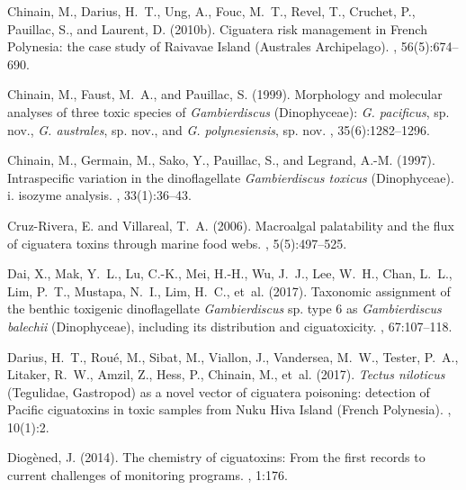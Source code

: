 \documentclass[10pt,letterpaper]{article}
\begin{document}
\begin{thebibliography}{10}
Chinain, M., Darius, H.~T., Ung, A., Fouc, M.~T., Revel, T., Cruchet, P.,
  Pauillac, S., and Laurent, D. (2010b).
\newblock Ciguatera risk management in {F}rench {P}olynesia: the case study of
  {R}aivavae {I}sland ({A}ustrales {A}rchipelago).
, 56(5):674--690.

Chinain, M., Faust, M.~A., and Pauillac, S. (1999).
\newblock Morphology and molecular analyses of three toxic species of
  \emph{Gambierdiscus} ({D}inophyceae): \emph{G. pacificus}, sp. nov., \emph{G.
  australes}, sp. nov., and \emph{G. polynesiensis}, sp. nov.
, 35(6):1282--1296.

Chinain, M., Germain, M., Sako, Y., Pauillac, S., and Legrand, A.-M. (1997).
\newblock Intraspecific variation in the dinoflagellate \emph{Gambierdiscus
  toxicus} ({D}inophyceae). i. isozyme analysis.
, 33(1):36--43.

Cruz-Rivera, E. and Villareal, T.~A. (2006).
\newblock Macroalgal palatability and the flux of ciguatera toxins through
  marine food webs.
, 5(5):497--525.

Dai, X., Mak, Y.~L., Lu, C.-K., Mei, H.-H., Wu, J.~J., Lee, W.~H., Chan, L.~L.,
  Lim, P.~T., Mustapa, N.~I., Lim, H.~C., et~al. (2017).
\newblock Taxonomic assignment of the benthic toxigenic dinoflagellate
  \emph{Gambierdiscus} sp. type 6 as \emph{Gambierdiscus balechii}
  ({D}inophyceae), including its distribution and ciguatoxicity.
, 67:107--118.

Darius, H.~T., Rou{\'e}, M., Sibat, M., Viallon, J., Vandersea, M.~W., Tester,
  P.~A., Litaker, R.~W., Amzil, Z., Hess, P., Chinain, M., et~al. (2017).
\newblock \emph{Tectus niloticus} ({T}egulidae, {G}astropod) as a novel vector
  of ciguatera poisoning: detection of {P}acific ciguatoxins in toxic samples
  from {N}uku {H}iva {I}sland ({F}rench {P}olynesia).
, 10(1):2.

Diog{\`e}ned, J. (2014).
\newblock The chemistry of ciguatoxins: From the first records to current
  challenges of monitoring programs.
,
  1:176.


\end{thebibliography}
\end{document}
